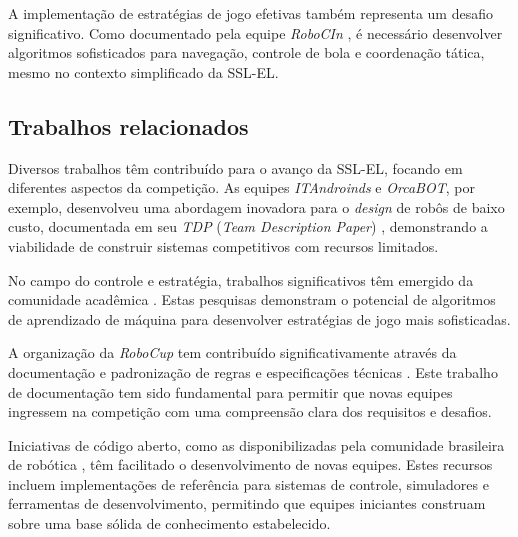 A implementação de estratégias de jogo efetivas também representa um desafio significativo. Como documentado pela equipe \textit{RoboCIn} \cite{robocin_tdp_2024}, é necessário desenvolver algoritmos sofisticados para navegação, controle de bola e coordenação tática, mesmo no contexto simplificado da SSL-EL.

\subsection{Trabalhos relacionados}
\label{subsec:futebol_trabalhos}

Diversos trabalhos têm contribuído para o avanço da SSL-EL, focando em diferentes aspectos da competição. As equipes \textit{ITAndroinds} e \textit{OrcaBOT}, por exemplo, desenvolveu uma abordagem inovadora para o \textit{design} de robôs de baixo custo, documentada em seu \textit{TDP} (\textit{Team Description Paper}) \cite{orcabot_tdp_2024} \cite{itandroids_tdp_2023}, demonstrando a viabilidade de construir sistemas competitivos com recursos limitados.

No campo do controle e estratégia, trabalhos significativos têm emergido da comunidade acadêmica \cite{bruno_brandao} \cite{robocin_trabalho}. Estas pesquisas demonstram o potencial de algoritmos de aprendizado de máquina para desenvolver estratégias de jogo mais sofisticadas.

A organização da \textit{RoboCup} tem contribuído significativamente através da documentação e padronização de regras e especificações técnicas \cite{regras_ssl_el_2024}. Este trabalho de documentação tem sido fundamental para permitir que novas equipes ingressem na competição com uma compreensão clara dos requisitos e desafios.

Iniciativas de código aberto, como as disponibilizadas pela comunidade brasileira de robótica \cite{robocup_ssl_brasil}, têm facilitado o desenvolvimento de novas equipes. Estes recursos incluem implementações de referência para sistemas de controle, simuladores e ferramentas de desenvolvimento, permitindo que equipes iniciantes construam sobre uma base sólida de conhecimento estabelecido.